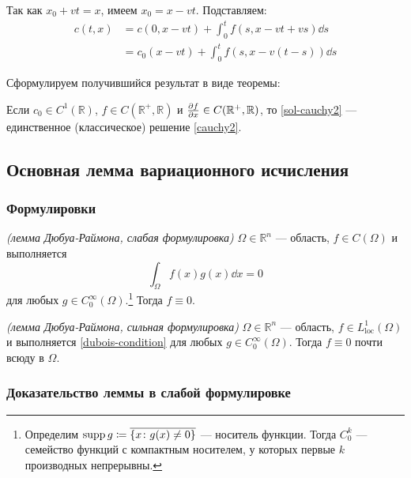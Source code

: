 Так как $x_0 + vt = x$, имеем $x_0 = x - vt$. Подставляем:
%
\begin{equation}
  \begin{aligned}
  c(t, x) &= c(0, x - vt) + \int_0^t f(s, x - vt + vs) \dd s\\
  &= c_0(x - vt) + \int_0^t f(s, x - v(t - s)) \dd s
  \end{aligned} \label{sol-cauchy2}
\end{equation}

Сформулируем получившийся результат в виде теоремы:
%
\begin{thm}
  Если $c_0 \in C^1(\mathbb{R})$, $f \in C(\mathbb{R}^+, \mathbb{R})$ и $\pdv{f}{x} \in C(\mathbb{R}^+, \mathbb{R})$, то \eqref{sol-cauchy2} --- единственное (классическое) решение \eqref{cauchy2}.
\end{thm}

\subsection{Основная лемма вариационного исчисления}

\subsubsection{Формулировки}

\begin{lem}\emph{(лемма Дюбуа-Раймона, слабая формулировка)}
  $\Omega \in \mathbb{R}^n$ --- область, $f \in C(\Omega)$ и выполняется \begin{equation}
    \int_\Omega f(x) g(x) \dd x = 0 \label{dubois-condition}
  \end{equation}
  для любых $g \in C_0^\infty(\Omega)$.\footnote{Определим $\operatorname{supp} g \coloneqq \overline{\{x \colon g(x) \neq 0 \}}$ --- носитель функции. Тогда $C_0^k$ --- семейство функций с компактным носителем, у которых первые $k$ производных непрерывны.} Тогда $f \equiv 0$.
\end{lem}

\begin{lem}\emph{(лемма Дюбуа-Раймона, сильная формулировка)}
  $\Omega \in \mathbb{R}^n$ --- область, {\color{red} $f \in L^1_{\mathrm{loc}}(\Omega)$} и выполняется \eqref{dubois-condition} для любых $g \in C_0^\infty(\Omega)$. Тогда $f \equiv 0$ {\color{red} почти всюду в $\Omega$}.
\end{lem}

\subsubsection{Доказательство леммы в слабой формулировке}


